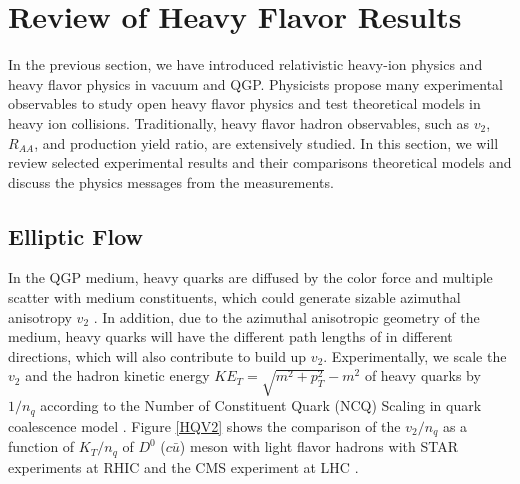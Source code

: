 \chapter{Review of Heavy Flavor Results}

In the previous section, we have introduced relativistic heavy-ion physics and heavy flavor physics in vacuum and QGP. Physicists propose many experimental observables to study open heavy flavor physics and test theoretical models in heavy ion collisions. Traditionally, heavy flavor hadron observables, such as $v_2$, $R_{AA}$, and production yield ratio, are extensively studied. In this section, we will review selected experimental results and their comparisons theoretical models and discuss the physics messages from the measurements.


\section{Elliptic Flow}


In the QGP medium, heavy quarks are diffused by the color force and multiple scatter with medium constituents, which could generate sizable azimuthal anisotropy $v_2$ \cite{HQReview}. In addition, due to the azimuthal anisotropic geometry of the medium, heavy quarks will have the different path lengths of in different directions, which will also contribute to build up $v_2$. Experimentally, we scale the $v_2$ and the hadron kinetic energy $KE_T = \sqrt{m^2 + p_T^2} - m^2$ of heavy quarks by $1/n_q$ according to the Number of Constituent Quark (NCQ) Scaling in quark coalescence model \cite{NCQScaling}. Figure \ref{HQV2} shows the comparison of the $v_2/n_q$ as a function of $K_T/n_q$ of $D^0$ ($c\bar u$) meson with light flavor hadrons with STAR experiments at RHIC \cite{STARD0v2} and the CMS experiment at LHC \cite{CMSD0v2}.


